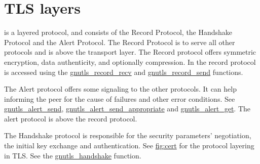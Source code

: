\newpage
\section{TLS layers}

\tlsI{} is a layered protocol, and consists of the Record Protocol,
the Handshake Protocol and the Alert Protocol. The Record Protocol
is to serve all other protocols and is above the transport layer.
The Record protocol offers symmetric encryption, data authenticity, and
optionally compression.
In \gnutls{} the record protocol is accessed using the 
\hyperref{gnutls\_record\_recv()}{gnutls\_record\_recv() (see Section }{)}{gnutls_record_recv} and
\hyperref{gnutls\_record\_send()}{gnutls\_record\_send() (see Section }{)}{gnutls_record_send}
functions.

\par
The Alert protocol offers some signaling to the other protocols. It can
help informing the peer for the cause of failures and other error
conditions. See
\hyperref{gnutls\_alert\_send()}{gnutls\_alert\_send() (see Section }{)}{gnutls_alert_send},
\hyperref{gnutls\_alert\_send\_appropriate()}{gnutls\_alert\_send\_appropriate() (see Section }{)}{gnutls_alert_send_appropriate}
and
\hyperref{gnutls\_alert\_get()}{gnutls\_alert\_get() (see Section }{)}{gnutls_alert_get}.
The alert protocol is above the record protocol.

\par 
The Handshake protocol is responsible for the security parameters'
negotiation, the initial key exchange and
authentication. See \hyperref{figure}{figure }{}{fig:cert} for the
protocol layering in TLS. See the
\hyperref{gnutls\_handshake()}{gnutls\_handshake() (see Section }{)}{gnutls_handshake} function.

